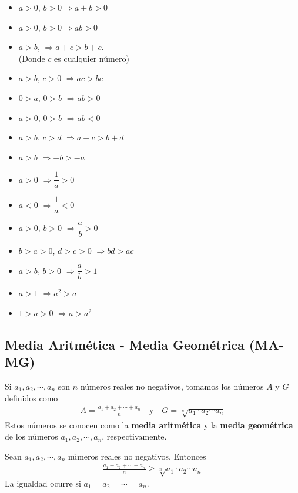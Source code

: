 \begin{multicols}{2}

    \begin{itemize}
        \item $a > 0$, $b > 0 \Longrightarrow a + b > 0$
        \item $a > 0$, $b > 0 \Longrightarrow ab > 0$
        \item $a > b$, $\Longrightarrow a + c > b + c$.\\(Donde $c$ es cualquier número)
        \item $a > b$, $c > 0$ $\Longrightarrow ac > bc$
        \item $0 > a$, $0 > b$ $\Longrightarrow ab > 0$
        \item $a > 0$, $0 > b$ $\Longrightarrow ab < 0$
        \item $a > b$, $c > d$ $\Longrightarrow a + c > b + d$
        \item $a > b$ $\Longrightarrow -b > -a$
        \item $a > 0$ $\Longrightarrow \dfrac{1}{a} > 0$
        \item $a < 0$ $\Longrightarrow \dfrac{1}{a} < 0$
        \item $a > 0$, $b > 0$ $\Longrightarrow \dfrac{a}{b} > 0$
        \item $b > a > 0$, $d > c > 0$ $\Longrightarrow bd > ac$
        \item $a > b$, $b > 0$ $\Longrightarrow \dfrac{a}{b} > 1$
        \item $a > 1$ $\Longrightarrow a^2 > a$
        \item $1 > a > 0$ $\Longrightarrow a > a^2$
    \end{itemize}
\end{multicols}

\subsection{Media Aritmética - Media Geométrica (MA-MG)}
Si $a_1, a_2, \cdots, a_n$ son $n$ números reales no negativos, tomamos los números $A$ y $G$ definidos como
\begin{gather*}
    A = \frac{a_1 + a_2 + \cdots + a_n}{n} \quad \mbox{y} \quad
    G = \sqrt[n]{a_1 \cdot a_2 \cdots a_n}
\end{gather*}
Estos números se conocen como la \textbf{media aritmética} y la \textbf{media geométrica} de los números $a_1, a_2, \cdots, a_n$, respectivamente.

\begin{theorem}
    Sean $a_1, a_2, \cdots, a_n$ números reales no negativos.
    Entonces
    \begin{gather*}
        \boxed
        {
            \frac{a_1 + a_2 + \cdots + a_n}{n} \geq \sqrt[n]{a_1 \cdot a_2 \cdots a_n}
        }
    \end{gather*}
    La igualdad ocurre si $a_1 = a_2 = \cdots = a_n$.
\end{theorem}

